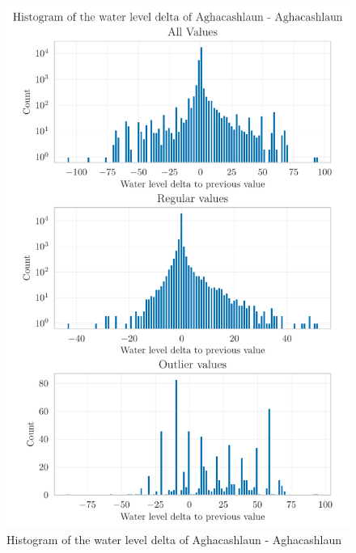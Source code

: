\begin{figure}[htp]
    \centering
    \includegraphics{./plots/pdfs/36022-ie/water_level_delta_histogram_36022-ie.pdf}
    \caption{Histogram of the water level delta of Aghacashlaun - Aghacashlaun}
    \label{figure:water-level-delta-histogram-36022-ie}
\end{figure}

